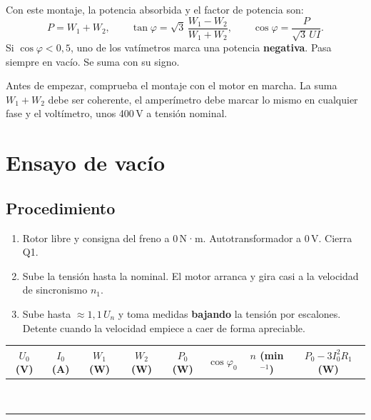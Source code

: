 \documentclass[11pt,a4paper]{article}
\begin{document}
\vspace{-4pt}
Con este montaje, la potencia absorbida y el factor de potencia son:
\[
  P = W_1 + W_2, \qquad \tan\varphi = \sqrt3\,\frac{W_1 - W_2}{W_1 + W_2}, \qquad \cos\varphi = \frac{P}{\sqrt3\,U I}.
\]
Si $\cos\varphi < 0{,}5$, uno de los vatímetros marca una potencia \textbf{negativa}. Pasa siempre en vacío. Se suma con su signo.

\begin{nota}
  Antes de empezar, comprueba el montaje con el motor en marcha. La suma $W_1 + W_2$ debe ser coherente, el amperímetro debe marcar lo mismo en cualquier fase y el voltímetro, unos 400\,V a tensión nominal.
\end{nota}

\section{Ensayo de vacío}
\subsection*{Procedimiento}
\begin{enumerate}
  \item Rotor libre y consigna del freno a 0\,N·m. Autotransformador a 0\,V. Cierra Q1.
  \item Sube la tensión hasta la nominal. El motor arranca y gira casi a la velocidad de sincronismo $n_1$.
  \item Sube hasta $\approx 1{,}1\,U_n$ y toma medidas \textbf{bajando} la tensión por escalones. Detente cuando la velocidad empiece a caer de forma apreciable.
\end{enumerate}

\begin{tabularx}{\textwidth}{|C|C|C|C|C|C|C|C|}
  \hline
  $U_0$ (V) & $I_0$ (A) & $W_1$ (W) & $W_2$ (W) & $P_0$ (W) & $\cos\varphi_0$ & $n$ (min$^{-1}$) & $P_0 - 3I_0^2R_1$ (W) \\ \hline
   & & & & & & & \\[5pt] \hline
   & & & & & & & \\[5pt] \hline
   & & & & & & & \\[5pt] \hline
   & & & & & & & \\[5pt] \hline
   & & & & & & & \\[5pt] \hline
   & & & & & & & \\[5pt] \hline
   & & & & & & & \\[5pt] \hline
   & & & & & & & \\[5pt] \hline
   & & & & & & & \\[5pt] \hline
\end{tabularx}
\end{document}
